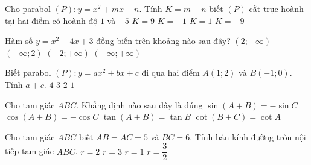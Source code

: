 \begin{ex}%
Cho parabol $(P) \colon y=x^2+m x+n$. Tính $K=m-n$ biết $(P)$ cắt trục hoành tại hai điểm có hoành độ $1$ và $-5$
\choice
{\True $K=9$}
{$K=-1$}
{$K=1$}
{$K=-9$}
\end{ex}
\begin{ex}%
Hàm số $y=x^2-4x+3$ đồng biến trên khoảng nào sau đây?
\choice
{\True $(2;+\infty)$}
{$(-\infty;2)$}
{$(-2;+\infty)$}
{$(-\infty;+\infty)$}
\end{ex}
\begin{ex}%
Biết parabol $(P): y=a x^2+b x+c$ đi qua hai điểm $A(1;2)$ và $B(-1;0)$. Tính $a+c$.
\choice
{$4$}
{$3$}
{$2$}
{\True $1$}
\end{ex}
\begin{ex}%
Cho tam giác $ABC$. Khẳng định nào sau đây là đúng
\choice
{$\sin (A+B)=-\sin C$}
{\True $\cos (A+B)=-\cos C$}
{$\tan (A+B)=\tan B$}
{$\cot (B+C)=\cot A$}
\end{ex}
\begin{ex}%
Cho tam giác $ABC$ biết $AB=AC=5$ và $BC=6$. Tính bán kính đường tròn nội tiếp tam giác $ABC$.
\choice
{$r=2$}
{$r=3$}
{$r=1$}
{\True $r=\dfrac{3}{2}$}
\end{ex}
